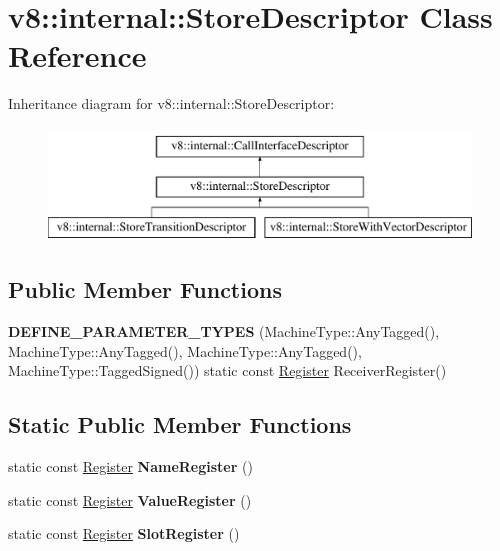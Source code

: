 \hypertarget{classv8_1_1internal_1_1StoreDescriptor}{}\section{v8\+:\+:internal\+:\+:Store\+Descriptor Class Reference}
\label{classv8_1_1internal_1_1StoreDescriptor}
Inheritance diagram for v8\+:\+:internal\+:\+:Store\+Descriptor\+:\begin{figure}[H]
\begin{center}
\leavevmode
\includegraphics[height=3.000000cm]{classv8_1_1internal_1_1StoreDescriptor}
\end{center}
\end{figure}
\subsection*{Public Member Functions}
\begin{DoxyCompactItemize}
\item 
\mbox{\label{classv8_1_1internal_1_1StoreDescriptor_a3e371b4919a0776627163f1789870d65}} 
{\bfseries D\+E\+F\+I\+N\+E\+\_\+\+P\+A\+R\+A\+M\+E\+T\+E\+R\+\_\+\+T\+Y\+P\+ES} (Machine\+Type\+::\+Any\+Tagged(), Machine\+Type\+::\+Any\+Tagged(), Machine\+Type\+::\+Any\+Tagged(), Machine\+Type\+::\+Tagged\+Signed()) static const \mbox{\hyperlink{classv8_1_1internal_1_1Register}{Register}} Receiver\+Register()
\end{DoxyCompactItemize}
\subsection*{Static Public Member Functions}
\begin{DoxyCompactItemize}
\item 
\mbox{\label{classv8_1_1internal_1_1StoreDescriptor_a3e8a31908fff1b70729f59fb53b8a557}} 
static const \mbox{\hyperlink{classv8_1_1internal_1_1Register}{Register}} {\bfseries Name\+Register} ()
\item 
\mbox{\label{classv8_1_1internal_1_1StoreDescriptor_a7b3fa0b29709a54c5fc88a0e051c5076}} 
static const \mbox{\hyperlink{classv8_1_1internal_1_1Register}{Register}} {\bfseries Value\+Register} ()
\item 
\mbox{\label{classv8_1_1internal_1_1StoreDescriptor_afce9faa37bfaf0db4c8a1a5b0f0d4e40}} 
static const \mbox{\hyperlink{classv8_1_1internal_1_1Register}{Register}} {\bfseries Slot\+Register} ()
\end{DoxyCompactItemize}
